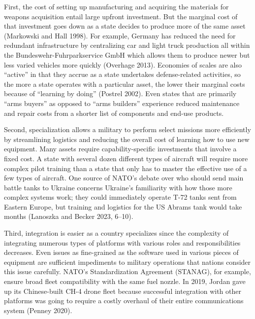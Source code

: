 \documentclass[
  12,
  letterpaper,
  DIV=11,
  numbers=noendperiod]{scrartcl}
\begin{document}
First, the cost of setting up manufacturing and acquiring the materials
for weapons acquisition entail large upfront investment. But the
marginal cost of that investment goes down as a state decides to produce
more of the same asset (Markowski and Hall 1998). For example, Germany
has reduced the need for redundant infrastructure by centralizing car
and light truck production all within the Bundeswehr-Fuhrparkservice
GmbH which allows them to produce newer but less varied vehicles more
quickly (Overhage 2013). Economies of scales are also ``active'' in that
they accrue as a state undertakes defense-related activities, so the
more a state operates with a particular asset, the lower their marginal
costs because of ``learning by doing'' (Postrel 2002). Even states that
are primarily ``arms buyers'' as opposed to ``arms builders'' experience
reduced maintenance and repair costs from a shorter list of components
and end-use products.

Second, specialization allows a military to perform select missions more
efficiently by streamlining logistics and reducing the overall cost of
learning how to use new equipment. Many assets require
capability-specific investments that involve a fixed cost. A state with
several dozen different types of aircraft will require more complex
pilot training than a state that only has to master the effective use of
a few types of aircraft. One source of NATO's debate over who should
send main battle tanks to Ukraine concerns Ukraine's familiarity with
how those more complex systems work; they could immediately operate T-72
tanks sent from Eastern Europe, but training and logistics for the US
Abrams tank would take months (Lanoszka and Becker 2023, 6--10).

Third, integration is easier as a country specializes since the
complexity of integrating numerous types of platforms with various roles
and responsibilities decreases. Even issues as fine-grained as the
software used in various pieces of equipment are sufficient impediments
to military operations that nations consider this issue carefully.
NATO's Standardization Agreement (STANAG), for example, ensure broad
fleet compatibility with the same fuel nozzle. In 2019, Jordan gave up
its Chinese-built CH-4 drone fleet because successful integration with
other platforms was going to require a costly overhaul of their entire
communications system (Penney 2020).
\end{document}
